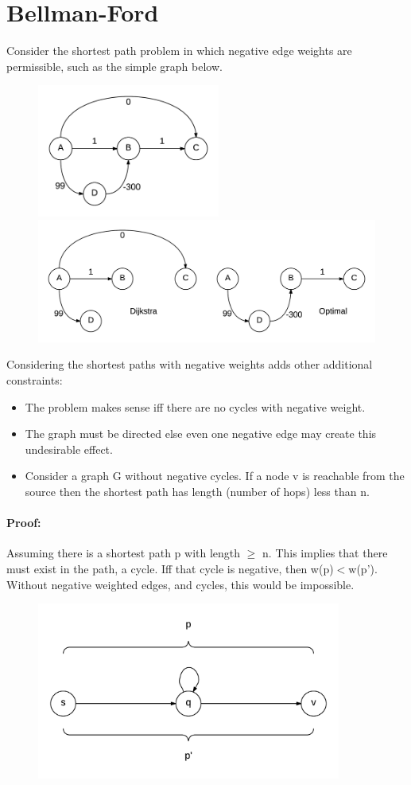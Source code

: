 \documentclass[12pt,letterpaper]{article}
\begin{document}
\section{Bellman-Ford}
Consider the shortest path problem in which negative edge weights are permissible, such as the simple graph below.
\begin{figure}[h]
\centering
\includegraphics[width=6cm]{bfex}
\includegraphics[width=12cm]{bfcd}
\end{figure}
\FloatBarrier
Considering the shortest paths with negative weights adds other additional constraints:
\begin{itemize}
\item The problem makes sense iff there are no cycles with negative weight.
\item The graph must be directed else even one negative edge may create this undesirable effect.
\item Consider a graph G without negative cycles. If a node v is reachable from the source then the shortest path has length (number of hops) less than n.
\end{itemize}

\paragraph{Proof:} Assuming there is a shortest path p with length $\geq$ n. This implies that there must exist in the path, a cycle. Iff that cycle is negative, then w(p)$<$w(p'). Without negative weighted edges, and cycles, this would be impossible.
\begin{figure}[h]
\centering
\includegraphics[width=10cm]{negcycles}
\end{figure}
\end{document}
